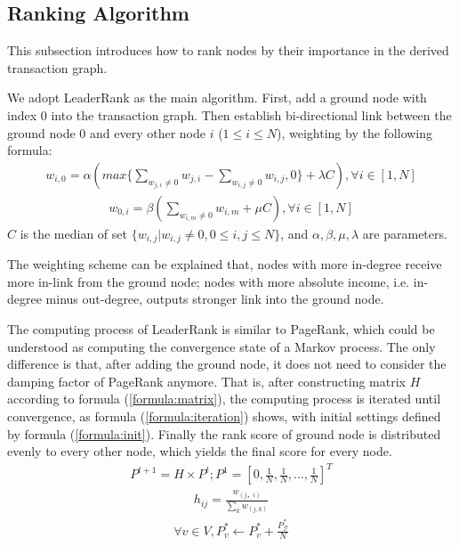 \subsection{Ranking Algorithm} \label{subsec:leaderrank}
This subsection introduces how to rank nodes by their importance in the derived transaction graph.

We adopt LeaderRank\cite{Chen2013}\cite{Li2014} as the main algorithm. First, add a ground node with index $0$ into the transaction graph. Then establish bi-directional link between the ground node $0$ and every other node $i$ ($1 \leq i \leq N$), weighting by the following formula:
\begin{align}\label{formula:weight1}
w_{i,0} = \alpha( max\{ \sum_{w_{j,i} \neq 0} w_{j,i} - \sum_{w_{i,j} \neq 0} w_{i,j} , 0\} + \lambda C ), \forall i \in [1,N]	
\end{align}
\begin{align}\label{formula:weight2} 
w_{0,i}	= \beta ( \sum_{w_{i,m} \neq 0} w_{i,m} + \mu C), \forall i \in [1,N]
\end{align}
$C$ is the median of set $\{w_{i,j} | w_{i,j} \neq 0, 0\leq i,j \leq N\}$, and $\alpha, \beta, \mu, \lambda$ are parameters. 

The weighting scheme can be explained that, nodes with more in-degree receive more in-link from the ground node; nodes with more absolute income, i.e. in-degree minus out-degree, outputs stronger link into the ground node. 

The computing process of LeaderRank is similar to PageRank, which could be understood as computing the convergence state of a Markov process. The only difference is that, after adding the ground node, it does not need to consider the damping factor of PageRank\cite{Brin2010}\cite{page1999pagerank} anymore. That is, after constructing matrix $H$ according to formula (\ref{formula:matrix}), the computing process is iterated until convergence, as formula (\ref{formula:iteration}) shows, with initial settings defined by formula (\ref{formula:init}). Finally the rank score of ground node is distributed evenly to every other node, which yields the final score for every node.
\begin{align} \label{formula:iteration}
	P^{t+1} = H \times P^{t}; P^1=[0, \frac{1}{N}, \frac{1}{N}, \dots, \frac{1}{N}]^T
\end{align}
\begin{align} \label{formula:matrix}
	h_{ij} = \frac{w_{(j，i)}}{\sum_k w_{(j,k)}}
\end{align}
\begin{align} \label{formula:init}
\forall v \in V, P^*_v \leftarrow P^*_v + \frac{P^*_{\mathcal{G}}}{N}
\end{align}

